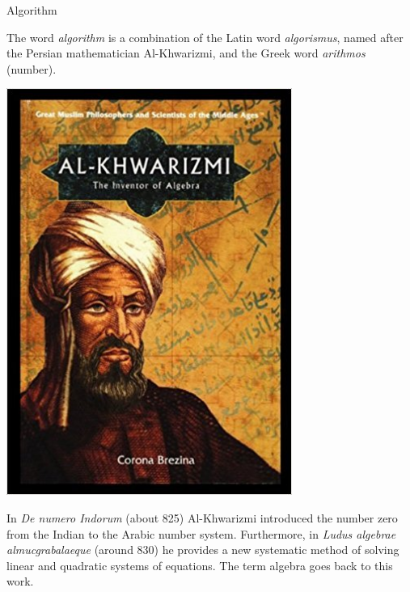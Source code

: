 








\begin{vbframe}{Algorithm}

The word \emph{algorithm} is a combination of the Latin word \emph{algorismus}, named after the Persian mathematician Al-Khwarizmi, and the Greek word \emph{arithmos} (number).

\lz

\begin{minipage}{0.4\textwidth}
  \begin{center}
\includegraphics[width=0.7\textwidth]{figure_man/alkhwarizmi.jpg}
  \end{center}
\end{minipage}
\begin{minipage}{0.5\textwidth}
  \begin{footnotesize}
  In \emph{De numero Indorum} (about 825) Al-Khwarizmi introduced the number zero from the Indian to the Arabic number system. Furthermore, in \emph{Ludus algebrae almucgrabalaeque} (around 830) he provides a new systematic method of solving linear and quadratic systems of equations. The term algebra goes back to this work.
  \end{footnotesize}
\end{minipage}




\end{vbframe}
